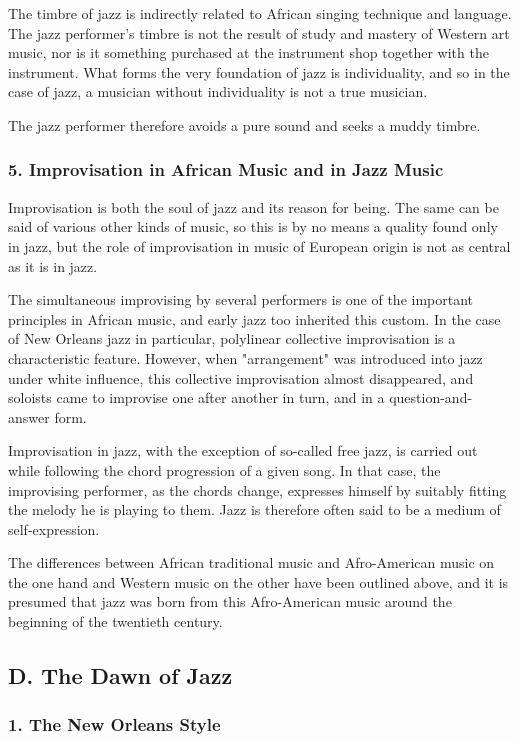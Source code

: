 The timbre of jazz is indirectly related to African singing technique and language. The jazz performer's timbre is not the result of study and mastery of Western art music, nor is it something purchased at the instrument shop together with the instrument. What forms the very foundation of jazz is individuality, and so in the case of jazz, a musician without individuality is not a true musician.

The jazz performer therefore avoids a pure sound and seeks a muddy timbre.

\subsubsection{5. Improvisation in African Music and in Jazz Music}

Improvisation is both the soul of jazz and its reason for being. The same can be said of various other kinds of music, so this is by no means a quality found only in jazz, but the role of improvisation in music of European origin is not as central as it is in jazz.

The simultaneous improvising by several performers is one of the important principles in African music, and early jazz too inherited this custom. In the case of New Orleans jazz in particular, polylinear collective improvisation is a characteristic feature. However, when "arrangement" was introduced into jazz under white influence, this collective improvisation almost disappeared, and soloists came to improvise one after another in turn, and in a question-and-answer form.

Improvisation in jazz, with the exception of so-called free jazz, is carried out while following the chord progression of a given song. In that case, the improvising performer, as the chords change, expresses himself by suitably fitting the melody he is playing to them. Jazz is therefore often said to be a medium of self-expression.

The differences between African traditional music and Afro-American music on the one hand and Western music on the other have been outlined above, and it is presumed that jazz was born from this Afro-American music around the beginning of the twentieth century.

\subsection{D. The Dawn of Jazz}

\subsubsection{1. The New Orleans Style}

